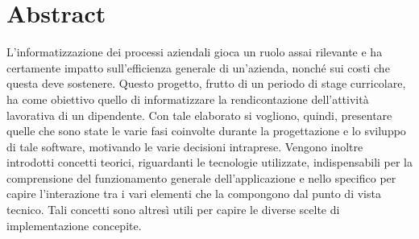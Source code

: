\newpage
\cleardoublepage
\begingroup
\let\clearpage\endgroup
\null{}
\chapter*{\centering Abstract}

L'informatizzazione dei processi aziendali gioca un ruolo assai rilevante e ha certamente impatto sull'efficienza generale di un'azienda, nonché sui costi che questa deve sostenere. Questo progetto, frutto di un periodo di stage curricolare, ha come obiettivo quello di informatizzare la rendicontazione dell'attività lavorativa di un dipendente. Con tale elaborato si vogliono, quindi, presentare quelle che sono state le varie fasi coinvolte durante la progettazione e lo sviluppo di tale software, motivando le varie decisioni intraprese. Vengono inoltre introdotti concetti teorici, riguardanti le tecnologie utilizzate, indispensabili per la comprensione del funzionamento generale dell'applicazione e nello specifico per capire l'interazione tra i vari elementi che la compongono dal punto di vista tecnico. Tali concetti sono altresì utili per capire le diverse scelte di implementazione concepite.

 \null



